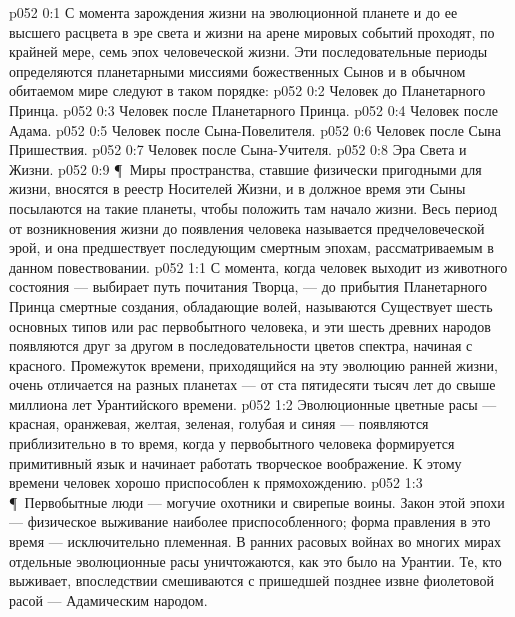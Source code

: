 \vs p052 0:1 С момента зарождения жизни на эволюционной планете и до ее высшего расцвета в эре света и жизни на арене мировых событий проходят, по крайней мере, семь эпох человеческой жизни. Эти последовательные периоды определяются планетарными миссиями божественных Сынов и в обычном обитаемом мире следуют в таком порядке:
\vs p052 0:2 \bibnobreakspace Человек до Планетарного Принца.
\vs p052 0:3 \bibnobreakspace Человек после Планетарного Принца.
\vs p052 0:4 \bibnobreakspace Человек после Адама.
\vs p052 0:5 \bibnobreakspace Человек после Сына\hyp{}Повелителя.
\vs p052 0:6 \bibnobreakspace Человек после Сына Пришествия.
\vs p052 0:7 \bibnobreakspace Человек после Сына\hyp{}Учителя.
\vs p052 0:8 \bibnobreakspace Эра Света и Жизни.
\vs p052 0:9 \P\ Миры пространства, ставшие физически пригодными для жизни, вносятся в реестр Носителей Жизни, и в должное время эти Сыны посылаются на такие планеты, чтобы положить там начало жизни. Весь период от возникновения жизни до появления человека называется предчеловеческой эрой, и она предшествует последующим смертным эпохам, рассматриваемым в данном повествовании.
\vs p052 1:1 С момента, когда человек выходит из животного состояния --- выбирает путь почитания Творца, --- до прибытия Планетарного Принца смертные создания, обладающие волей, называются  Существует шесть основных типов или рас первобытного человека, и эти шесть древних народов появляются друг за другом в последовательности цветов спектра, начиная с красного. Промежуток времени, приходящийся на эту эволюцию ранней жизни, очень отличается на разных планетах --- от ста пятидесяти тысяч лет до свыше миллиона лет Урантийского времени.
\vs p052 1:2 Эволюционные цветные расы --- красная, оранжевая, желтая, зеленая, голубая и синяя --- появляются приблизительно в то время, когда у первобытного человека формируется примитивный язык и начинает работать творческое воображение. К этому времени человек хорошо приспособлен к прямохождению.
\vs p052 1:3 \P\ Первобытные люди --- могучие охотники и свирепые воины. Закон этой эпохи --- физическое выживание наиболее приспособленного; форма правления в это время --- исключительно племенная. В ранних расовых войнах во многих мирах отдельные эволюционные расы уничтожаются, как это было на Урантии. Те, кто выживает, впоследствии смешиваются с пришедшей позднее извне фиолетовой расой --- Адамическим народом.
